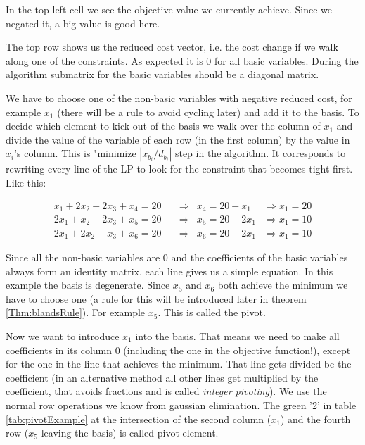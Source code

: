 \begin{Ex}
In the top left cell we see the objective value we currently achieve. Since we negated it, a big value is good here.

The top row shows us the reduced cost vector, i.e. the cost change if we walk along one of the constraints. As expected it is 0 for all basic variables. During the algorithm submatrix for the basic variables should be a diagonal matrix. 

We have to choose one of the non-basic variables with negative reduced cost, for example $x_1$ (there will be a rule to avoid cycling later) and add it to the basis. To decide which element to kick out of the basis we walk over the column of $x_1$ and divide the value of the variable of each row (in the first column) by the value in $x_i$'s column. This is "minimize $|x_{b_i}/d_{b_i}|$ step in the algorithm. It corresponds to rewriting every line of the LP to look for the constraint that becomes tight first. Like this:

\begin{align*}
x_1 + 2 x_2 + 2 x_3 + x_4 = 20 & \quad \Rightarrow & x_4 = 20 - x_1    & \Rightarrow x_1 = 20\\
2 x_1 +x_2 + 2 x_3 + x_5 = 20  & \quad \Rightarrow & x_5 = 20 - 2 x_1  & \Rightarrow x_1 = 10 \\
2 x_1 + 2 x_2 + x_3 + x_6 = 20 & \quad \Rightarrow & x_6 = 20 - 2 x_1  &\Rightarrow x_1 = 10
\end{align*}

Since all the non-basic variables are $0$ and the coefficients of the basic variables always form an identity matrix, each line gives us a simple equation. In this example the basis is degenerate. Since $x_5$ and $x_6$ both achieve the minimum we have to choose one (a rule for this will be introduced later in theorem \ref{Thm:blandsRule}). For example $x_5$. This is called the pivot.

Now we want to introduce $x_1$ into the basis. That means we need to make all coefficients in its column 0 (including the one in the objective function!), except for the one in the line that achieves the minimum. That line gets divided be the coefficient (in an alternative method all other lines get multiplied by the coefficient, that avoids fractions and is called \emph{integer pivoting}). We use the normal row operations we know from gaussian elimination. The green '2' in table \ref{tab:pivotExample} at the intersection of the second column ($x_1$) and the fourth row ($x_5$ leaving the basis) is called pivot element.


\end{Ex}
